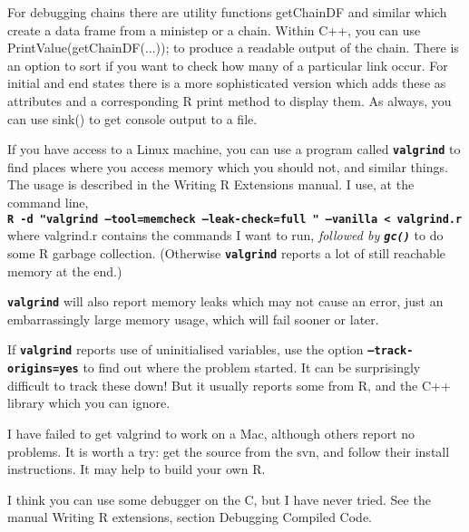 \documentclass[12pt, a4paper]{article}
\renewcommand{\=}{\,=\,}
\newcommand{\+}{\,+\,}
\newcommand{\sfn}[1]{\textbf{\texttt{#1}}}
\begin{document}
For debugging chains there are utility functions \textsf{getChainDF} and similar
which create a data frame from a ministep or a chain. Within C++, you can use
\textsf{PrintValue(getChainDF(...));} to produce a readable output of the
chain. There is an option to sort if you want to check how many of a particular
link occur. For initial and end states there is a more sophisticated version
which adds these as attributes and a corresponding R print method to display
them. As always, you can use sink() to get console output to a file.

If you have access to a Linux machine, you can use a program called
\sfn{valgrind} to find places where you access memory which you should not, and
similar things. The usage is described in the Writing R Extensions manual. I
use, at the command line,\\
\sfn{R -d "valgrind --tool=memcheck --leak-check=full " --vanilla < valgrind.r}
\\
where valgrind.r contains the commands I want to run, \emph{followed by
  \sfn{gc()}} to do some R garbage collection. (Otherwise \sfn{valgrind} reports
a lot of still reachable memory at the end.)

\sfn{valgrind} will also report memory leaks which may not cause an error, just
an embarrassingly large memory usage, which will fail sooner or later.

If \sfn{valgrind} reports use of uninitialised variables, use the option
\sfn{--track-origins=yes} to find out where the problem started. It can be
surprisingly difficult to track these down! But it usually reports some from R,
and the C++ library which you can ignore.

I have failed to get valgrind to work on a Mac, although others report no
problems. It is worth a try: get the source from the svn, and follow their
install instructions. It may help to build your own R.

I think you can use some debugger on the C, but I have never tried. See the
manual Writing R extensions, section Debugging Compiled Code.
\end{document}
